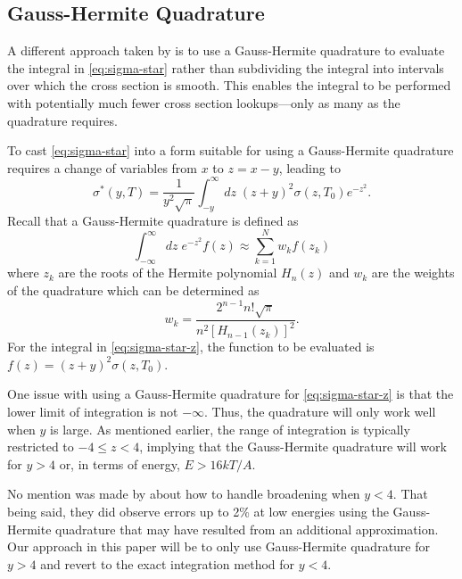 \documentclass[3p,authoryear]{elsarticle}
\begin{document}
\subsection{Gauss-Hermite Quadrature}

A different approach taken by \citet{nd-dean-2010} is to use a Gauss-Hermite
quadrature to evaluate the integral in \autoref{eq:sigma-star} rather than
subdividing the integral into intervals over which the cross section is
smooth. This enables the integral to be performed with potentially much fewer
cross section lookups---only as many as the quadrature requires.

To cast \autoref{eq:sigma-star} into a form suitable for using a Gauss-Hermite
quadrature requires a change of variables from $x$ to $z = x - y$, leading to
\begin{equation}
  \label{eq:sigma-star-z}
  \sigma^* (y,T) = \frac{1}{y^2\sqrt{\pi}} \int_{-y}^{\infty} dz \; (z + y)^2
  \sigma(z,T_0) e^{-z^2}.
\end{equation}
Recall that a Gauss-Hermite quadrature is defined as
\begin{equation}
  \int_{-\infty}^{\infty} dz \; e^{-z^2} f(z) \approx \sum_{k=1}^N w_k f(z_k)
\end{equation}
where $z_k$ are the roots of the Hermite polynomial $H_n(z)$ and $w_k$ are the
weights of the quadrature which can be determined as
\begin{equation}
  w_k = \frac{2^{n-1} n! \sqrt{\pi}}{n^2 \left [ H_{n-1} (z_k) \right ]^2}.
\end{equation}
For the integral in \autoref{eq:sigma-star-z}, the function to be evaluated is
$f(z) = (z+y)^2 \sigma(z,T_0)$.

One issue with using a Gauss-Hermite quadrature for \autoref{eq:sigma-star-z} is
that the lower limit of integration is not $-\infty$. Thus, the quadrature will
only work well when $y$ is large. As mentioned earlier, the range of integration
is typically restricted to $-4 \le z < 4$, implying that the Gauss-Hermite
quadrature will work for $y > 4$ or, in terms of energy, $E > 16kT/A$.

No mention was made by \citet{nd-dean-2010} about how to handle broadening when
$y < 4$. That being said, they did observe errors up to 2\% at low energies
using the Gauss-Hermite quadrature that may have resulted from an additional
approximation. Our approach in this paper will be to only use Gauss-Hermite
quadrature for $y > 4$ and revert to the exact integration method for $y < 4$.
\end{document}
